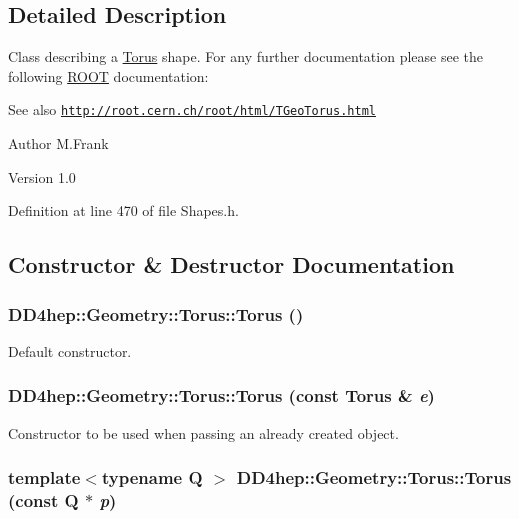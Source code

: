 \subsection{Detailed Description}
Class describing a \hyperlink{class_d_d4hep_1_1_geometry_1_1_torus}{Torus} shape. For any further documentation please see the following \hyperlink{namespace_r_o_o_t}{ROOT} documentation: \begin{DoxySeeAlso}{See also}
\href{http://root.cern.ch/root/html/TGeoTorus.html}{\tt http://root.cern.ch/root/html/TGeoTorus.html}
\end{DoxySeeAlso}
\begin{DoxyAuthor}{Author}
M.Frank 
\end{DoxyAuthor}
\begin{DoxyVersion}{Version}
1.0 
\end{DoxyVersion}


Definition at line 470 of file Shapes.h.

\subsection{Constructor \& Destructor Documentation}
\hypertarget{class_d_d4hep_1_1_geometry_1_1_torus_a6ad2df832a95cb0dd9868a035c25da33}{
\subsubsection[{Torus}]{\setlength{\rightskip}{0pt plus 5cm}DD4hep::Geometry::Torus::Torus ()}}
\label{class_d_d4hep_1_1_geometry_1_1_torus_a6ad2df832a95cb0dd9868a035c25da33}


Default constructor. \hypertarget{class_d_d4hep_1_1_geometry_1_1_torus_afc112d71d974aa148df42a03b11d5bee}{
\subsubsection[{Torus}]{\setlength{\rightskip}{0pt plus 5cm}DD4hep::Geometry::Torus::Torus (const {\bf Torus} \& {\em e})}}
\label{class_d_d4hep_1_1_geometry_1_1_torus_afc112d71d974aa148df42a03b11d5bee}


Constructor to be used when passing an already created object. \hypertarget{class_d_d4hep_1_1_geometry_1_1_torus_a1e0d5fc81c65852ca86ec2c21adf6898}{
\subsubsection[{Torus}]{\setlength{\rightskip}{0pt plus 5cm}template$<$typename Q $>$ DD4hep::Geometry::Torus::Torus (const Q $\ast$ {\em p})}}
\label{class_d_d4hep_1_1_geometry_1_1_torus_a1e0d5fc81c65852ca86ec2c21adf6898}


